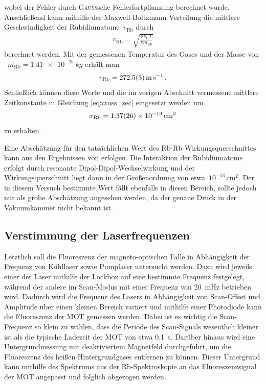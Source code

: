 \documentclass[11pt, a4paper]{article}
\numberwithin{equation}{section}
\begin{document}
wobei der Fehler durch \textsc{Gauß}sche Fehlerfortpflanzung berechnet wurde.
Anschließend kann mithilfe der Maxwell-Boltzmann-Verteilung die mittlere Geschwindigkeit der Rubidiumatome~$v_\mathrm{Rb}$ durch
\begin{align*}
	v_\mathrm{Rb} = \sqrt{\frac{8 k_\mathrm{B} T}{\pi m_\mathrm{Rb}}} 
\end{align*}
berechnet werden.
Mit der gemessenen Temperatur des Gases und der Masse von ~$m_\mathrm{Rb} = \SI{1.41e-25}{kg}$ \cite{handbook_spectroscopic_data} erhält man
\begin{align*}
	v_\mathrm{Rb} = \SI{272.5 +- 0.3}{\meter\per\second} \, \text{.}
\end{align*}
Schließlich können diese Werte und die im vorigen Abschnitt vermessene mittlere Zeitkonstante in Gleichung \eqref{eq:cross_sec} eingesetzt werden um
\begin{align*}
	\sigma_\mathrm{Rb} &= \SI{1.37 +- 0.26e-13}{\centi\meter\squared}\\
\end{align*}
zu erhalten.

Eine Abschätzung für den tatsächlichen Wert des Rb-Rb Wirkungsquerschnittes kann aus den Ergebnissen von \cite{force_in_mot} erfolgen.
Die Interaktion der Rubidiumatome erfolgt durch resonante Dipol-Dipol-Wechselwirkung und der Wirkungsquerschnitt liegt dann in der Größenordnung von etwa~$10^{-13} \, \si{\centi\meter\squared}$.
Der in diesem Versuch bestimmte Wert fällt ebenfalls in diesen Bereich, sollte jedoch nur als grobe Abschätzung angesehen werden, da der genaue Druck in der Vakuumkammer nicht bekannt ist.


\subsection{Verstimmung der Laserfrequenzen}
Letztlich soll die Fluoreszenz der magneto-optischen Falle in Abhängigkeit der Frequenz von Kühllaser sowie Pumplaser untersucht werden.
Dazu wird jeweils einer der Laser mithilfe der Lockbox auf eine bestimmte Frequenz festgelegt, während der andere im Scan-Modus mit einer Frequenz von \SI{20}{mHz} betrieben wird.
Dadurch wird die Frequenz des Lasers in Abhängigkeit von Scan-Offset und Amplitude über einen kleinen Bereich variiert und mithilfe einer Photodiode kann die Fluoreszenz der MOT gemessen werden.
Dabei ist es wichtig die Scan-Frequenz so klein zu wählen, dass die Periode des Scan-Signals wesentlich kleiner ist als die typische Ladezeit der MOT von etwa \SI{0.1}{s}.
Darüber hinaus wird eine Untergrundmessung mit deaktiviertem Magnetfeld durchgeführt, um die Fluoreszenz des heißen Hintergrundgases entfernen zu können.
Dieser Untergrund kann mithilfe des Spektrums aus der Rb-Spektroskopie an das Fluoreszenzsignal der MOT angepasst und folglich abgezogen werden.
\end{document}
